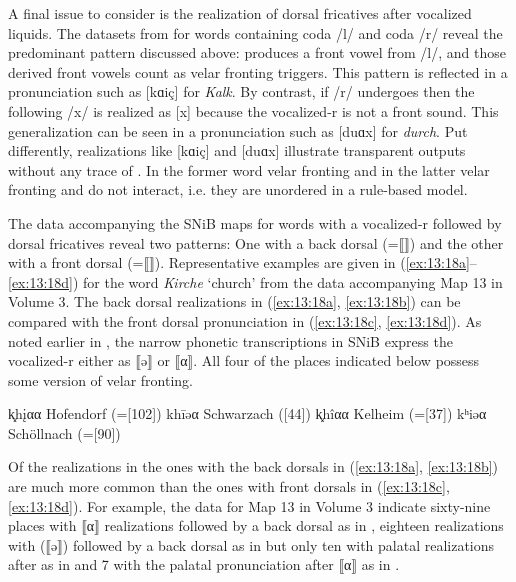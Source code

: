 A final issue to consider is the realization of dorsal fricatives after vocalized liquids. The datasets from  for words containing coda /l/ and coda /r/ reveal the predominant pattern discussed above:  produces a front vowel from /l/, and those derived front vowels count as velar fronting triggers. This pattern is reflected in a pronunciation such as [kɑiç] for \textit{Kalk}. By contrast, if /r/ undergoes  then the following /x/ is realized as [x] because the vocalized-r is not a front sound. This generalization can be seen in a pronunciation such as [duɑx] for \textit{durch}. Put differently, realizations like [kɑiç] and [duɑx] illustrate transparent outputs without any trace of . In the former word   velar fronting and in the latter velar fronting and  do not interact, i.e. they are unordered in a rule-based model.

The data accompanying the SNiB maps for words with a vocalized-r followed by dorsal fricatives reveal two patterns: One with a back dorsal (=⟦⟧) and the other with a front dorsal (=⟦⟧). Representative examples are given in (\ref{ex:13:18a}--\ref{ex:13:18d}) for the word \textit{Kirche} ‘church’ from the data accompanying Map 13 in Volume 3. The back dorsal realizations in (\ref{ex:13:18a}, \ref{ex:13:18b}) can be compared with the front dorsal pronunciation in (\ref{ex:13:18c}, \ref{ex:13:18d}). As noted earlier in , the narrow phonetic transcriptions in SNiB express the vocalized-r either as ⟦ə⟧ or ⟦α⟧. All four of the places indicated below possess some version of velar fronting.

\ea%
\label{ex:13:18}
\ea\label{ex:13:18a}k͓h\k{i}αα \tab Hofendorf (=[102])
\ex\label{ex:13:18b}khīəα     \tab Schwarzach ([44])
\ex\label{ex:13:18c}k͓hîαα     \tab  Kelheim (=[37])
\ex\label{ex:13:18d}kʰiəα     \tab Schöllnach (=[90])
\z 
\z 

Of the realizations in  the ones with the back dorsals in (\ref{ex:13:18a}, \ref{ex:13:18b}) are much more common than the ones with front dorsals in (\ref{ex:13:18c}, \ref{ex:13:18d}). For example, the data for Map 13 in Volume 3 indicate sixty-nine places with ⟦α⟧ realizations followed by a back dorsal as in , eighteen realizations with  (⟦ə⟧) followed by a back dorsal as in  but only ten with palatal realizations after  as in  and 7 with the palatal pronunciation after ⟦α⟧ as in .

